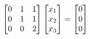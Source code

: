 \documentclass[preview]{standalone}
\begin{document}
\begin{align*}
\special{dvisvgm:raw <g id='unique000'>}\begin{bmatrix} 0 & 1 & 1 \\ 0 & 1 & 1 \\ 0 & 0 & 2 \end{bmatrix} \begin{bmatrix} x_1 \\ x_2 \\ x_3 \end{bmatrix} = \begin{bmatrix} 0 \\ 0 \\ 0 \end{bmatrix}\special{dvisvgm:raw </g>}
\end{align*}
\end{document}
